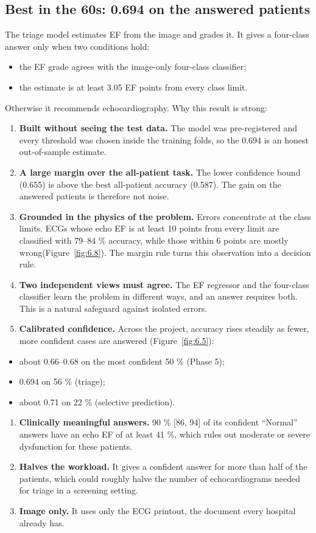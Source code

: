 \subsection{Best in the 60s: 0.694 on the answered patients}\label{sec:6.1.2}

The triage model estimates EF from the image and grades it. It gives a four-class answer only when two conditions hold:

\begin{itemize}
  \item the EF grade agrees with the image-only four-class classifier;
  \item the estimate is at least 3.05 EF points from every class limit.
\end{itemize}
Otherwise it recommends echocardiography. Why this result is strong:

\begin{enumerate}
  \item \textbf{Built without seeing the test data.} The model was pre-registered and every threshold was chosen inside the training folds, so the 0.694 is an honest out-of-sample estimate.
  \item \textbf{A large margin over the all-patient task.} The lower confidence bound (0.655) is above the best all-patient accuracy (0.587). The gain on the answered patients is therefore not noise.
  \item \textbf{Grounded in the physics of the problem.} Errors concentrate at the class limits. ECGs whose echo EF is at least 10 points from every limit are classified with 79--84 \% accuracy, while those within 6 points are mostly wrong(Figure~\ref{fig:6.8}). The margin rule turns this observation into a decision rule.
  \item \textbf{Two independent views must agree.} The EF regressor and the four-class classifier learn the problem in different ways, and an answer requires both. This is a natural safeguard against isolated errors.
  \item \textbf{Calibrated confidence.} Across the project, accuracy rises steadily as fewer, more confident cases are answered (Figure~\ref{fig:6.5}):
\end{enumerate}
\begin{itemize}
  \item about 0.66--0.68 on the most confident 50 \% (Phase 5);
  \item 0.694 on 56 \% (triage);
  \item about 0.71 on 22 \% (selective prediction).
\end{itemize}
\begin{enumerate}
  \item \textbf{Clinically meaningful answers.} 90 \% [86, 94] of its confident ``Normal'' answers have an echo EF of at least 41 \%, which rules out moderate or severe dysfunction for these patients.
  \item \textbf{Halves the workload.} It gives a confident answer for more than half of the patients, which could roughly halve the number of echocardiograms needed for triage in a screening setting.
  \item \textbf{Image only.} It uses only the ECG printout, the document every hospital already has.
\end{enumerate}
